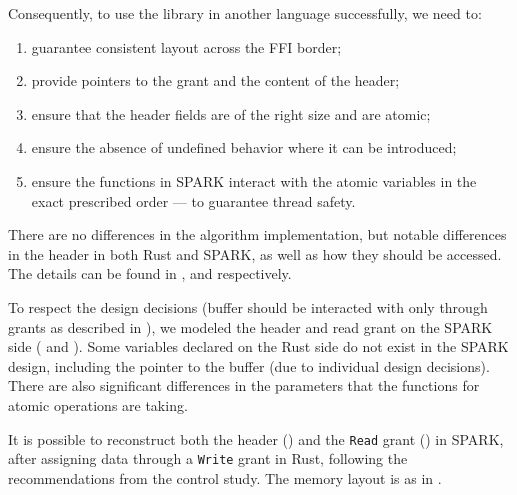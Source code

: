 \documentclass[nomenclature, english, bibtex]{kththesis}
\begin{document}
{Consequently, to use the library in another language successfully, we need to: 
\begin{enumerate}
    \item guarantee consistent layout across the FFI border; 
    \item provide pointers to the grant and the content of the header;
    \item ensure that the header fields are of the right size and are atomic;
    \item ensure the absence of undefined behavior where it can be introduced;
    \item ensure the functions in SPARK interact with the atomic variables in the exact prescribed order --- to guarantee thread safety.
\end{enumerate}



There are no differences in the algorithm implementation, but notable differences in the header in both Rust and SPARK, as well as how they should be accessed.
The details can be found in ,  and  respectively.

To respect the design decisions (buffer should be interacted with only through grants as described in ), we modeled the header and read grant on the SPARK side ( and ). Some variables declared on the Rust side do not exist in the SPARK design, including the pointer to the buffer (due to individual design decisions).
There are also significant differences in the parameters that the functions for atomic operations are taking.

It is possible to reconstruct both the header () and the \texttt{Read} grant () in SPARK, after assigning data through a \texttt{Write} grant in Rust, following the recommendations from the control study. The memory layout is as in .


}
\end{document}
